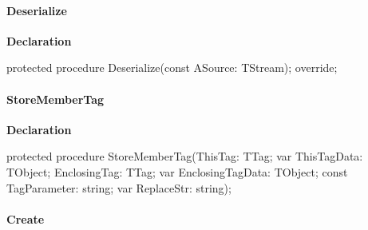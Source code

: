 \documentclass{report}
\newif\ifpdf
\begin{document}
\paragraph*{Deserialize}\hspace*{\fill}

\label{PasDoc_Items.TPasCio-Deserialize}
\begin{list}{}{
\setlength{\itemindent}{0cm}
\setlength{\listparindent}{0cm}
\setlength{\leftmargin}{\evensidemargin}
\addtolength{\leftmargin}{\tmplength}
\settowidth{\labelsep}{X}
\addtolength{\leftmargin}{\labelsep}
\setlength{\labelwidth}{\tmplength}
}
\item[\textbf{Declaration}\hfill]
\ifpdf
\begin{flushleft}
\fi
\begin{ttfamily}
protected procedure Deserialize(const ASource: TStream); override;\end{ttfamily}

\ifpdf
\end{flushleft}
\fi

\end{list}
\paragraph*{StoreMemberTag}\hspace*{\fill}

\label{PasDoc_Items.TPasCio-StoreMemberTag}
\begin{list}{}{
\setlength{\itemindent}{0cm}
\setlength{\listparindent}{0cm}
\setlength{\leftmargin}{\evensidemargin}
\addtolength{\leftmargin}{\tmplength}
\settowidth{\labelsep}{X}
\addtolength{\leftmargin}{\labelsep}
\setlength{\labelwidth}{\tmplength}
}
\item[\textbf{Declaration}\hfill]
\ifpdf
\begin{flushleft}
\fi
\begin{ttfamily}
protected procedure StoreMemberTag(ThisTag: TTag; var ThisTagData: TObject; EnclosingTag: TTag; var EnclosingTagData: TObject; const TagParameter: string; var ReplaceStr: string);\end{ttfamily}

\ifpdf
\end{flushleft}
\fi

\end{list}
\paragraph*{Create}\hspace*{\fill}
\end{document}
